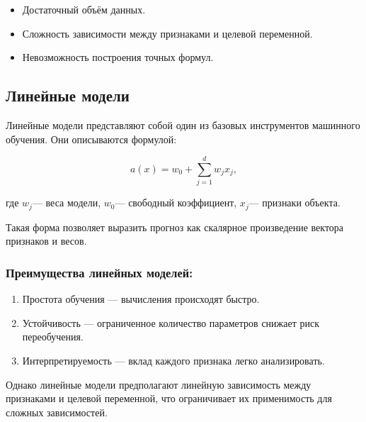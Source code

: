 \begin{itemize}
\tightlist
\item
  Достаточный объём данных.
\item
  Сложность зависимости между признаками и целевой переменной.
\item
  Невозможность построения точных формул.
\end{itemize}

\hypertarget{ux43bux438ux43dux435ux439ux43dux44bux435-ux43cux43eux434ux435ux43bux438}{%
\subsection*{Линейные
модели}\label{ux43bux438ux43dux435ux439ux43dux44bux435-ux43cux43eux434ux435ux43bux438}}

Линейные модели представляют собой один из базовых инструментов
машинного обучения. Они описываются формулой:

\begin{equation}
a(x) = w_0 + \sum_{j=1}^{d} w_j x_j,
\end{equation}


где \(w_j\)--- веса модели, \(w_0\)--- свободный коэффициент,
\(x_j\)--- признаки объекта.

Такая форма позволяет выразить прогноз как скалярное произведение
вектора признаков и весов.

\hypertarget{ux43fux440ux435ux438ux43cux443ux449ux435ux441ux442ux432ux430-ux43bux438ux43dux435ux439ux43dux44bux445-ux43cux43eux434ux435ux43bux435ux439}{%
\subsubsection*{Преимущества линейных
моделей:}\label{ux43fux440ux435ux438ux43cux443ux449ux435ux441ux442ux432ux430-ux43bux438ux43dux435ux439ux43dux44bux445-ux43cux43eux434ux435ux43bux435ux439}}

\begin{enumerate}
\def\labelenumi{\arabic{enumi}.}
\tightlist
\item
  Простота обучения --- вычисления происходят быстро.
\item
  Устойчивость --- ограниченное количество параметров снижает
  риск переобучения.
\item
  Интерпретируемость --- вклад каждого признака легко
  анализировать.
\end{enumerate}

Однако линейные модели предполагают линейную зависимость между
признаками и целевой переменной, что ограничивает их применимость для
сложных зависимостей.

